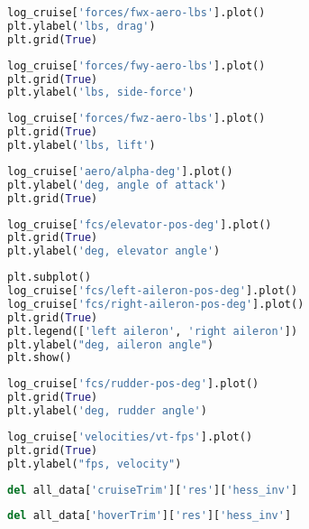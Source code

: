 \begin{lstlisting}[language=Python]
log_cruise['forces/fwx-aero-lbs'].plot()
plt.ylabel('lbs, drag')
plt.grid(True)
\end{lstlisting}

\begin{lstlisting}[language=Python]
log_cruise['forces/fwy-aero-lbs'].plot()
plt.grid(True)
plt.ylabel('lbs, side-force')
\end{lstlisting}

\begin{lstlisting}[language=Python]
log_cruise['forces/fwz-aero-lbs'].plot()
plt.grid(True)
plt.ylabel('lbs, lift')
\end{lstlisting}

\begin{lstlisting}[language=Python]
log_cruise['aero/alpha-deg'].plot()
plt.ylabel('deg, angle of attack')
plt.grid(True)
\end{lstlisting}

\begin{lstlisting}[language=Python]
log_cruise['fcs/elevator-pos-deg'].plot()
plt.grid(True)
plt.ylabel('deg, elevator angle')
\end{lstlisting}

\begin{lstlisting}[language=Python]
plt.subplot()
log_cruise['fcs/left-aileron-pos-deg'].plot()
log_cruise['fcs/right-aileron-pos-deg'].plot()
plt.grid(True)
plt.legend(['left aileron', 'right aileron'])
plt.ylabel("deg, aileron angle")
plt.show()
\end{lstlisting}

\begin{lstlisting}[language=Python]
log_cruise['fcs/rudder-pos-deg'].plot()
plt.grid(True)
plt.ylabel('deg, rudder angle')
\end{lstlisting}

\begin{lstlisting}[language=Python]
log_cruise['velocities/vt-fps'].plot()
plt.grid(True)
plt.ylabel("fps, velocity")
\end{lstlisting}

\begin{lstlisting}[language=Python]
del all_data['cruiseTrim']['res']['hess_inv']
\end{lstlisting}

\begin{lstlisting}[language=Python]
del all_data['hoverTrim']['res']['hess_inv']
\end{lstlisting}


